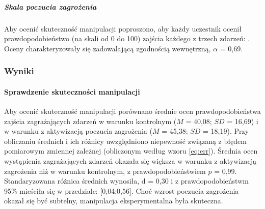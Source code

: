 \documentclass[man]{apa6}
\begin{document}
\subparagraph{Skala poczucia zagrożenia} Aby ocenić skuteczność manipulacji poproszono, aby każdy uczestnik ocenił prawdopodobieństwo (na skali od 0 do 100) zajścia każdego z trzech zdarzeń: \emph{}. Oceny charakteryzowały się zadowalającą zgodnością wewnętrzną, $\alpha$ = 0,69.

\subsubsection{Wyniki}
\paragraph{Sprawdzenie skuteczności manipulacji}
Aby ocenić skuteczność manipulacji porównano średnie ocen prawdopodobieństwa zajścia zagrażających zdarzeń w warunku kontrolnym ($M$ = 40,08; $SD$ = 16,69) i w warunku z aktywizacją poczucia zagrożenia ($M$ = 45,38; $SD$ = 18,19). Przy obliczaniu średnich i ich różnicy uwzględniono niepewność związaną z błędem pomiarowym zmiennej zależnej (obliczonym według wzoru \ref{eq:err}). Średnia ocen wystąpienia zagrażających zdarzeń okazała się większa w warunku z aktywizacją zagrożenia niż w warunku kontrolnym, z prawdopodobieństwiem $p$ = 0,99. Standaryzowana różnica średnich wynosiła, d = 0,30 i z prawdopodobieństwm 95\% mieściła się w przedziale: [0,04;0,56]. Choć wzrost poczucia zagrożenia okazał się być subtelny, manipulacja eksperymentalna była skuteczna.
\end{document}
